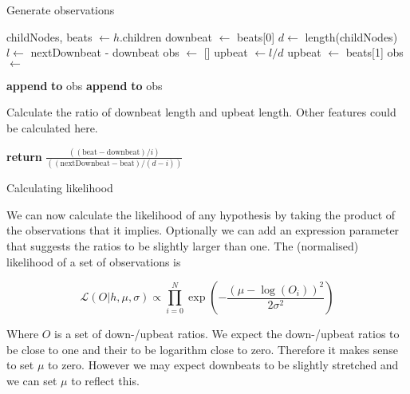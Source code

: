 \begin{algorithm}
\caption{Generate observations}
\label{alg:observations}
\begin{algorithmic}
	\State childNodes, beats $\leftarrow h$.children
		\State downbeat $\leftarrow$ beats[0]
	\EndIf
	\State $d \leftarrow$ length(childNodes)
	\State $l \leftarrow$ nextDownbeat - downbeat
	\State obs $\leftarrow$ []
		\State upbeat $\leftarrow l/d$
			\State upbeat $\leftarrow$ beats[1]
		\EndIf
		\State obs $\leftarrow$ 
	\EndIf
	
			\State \textbf{append}  \textbf{to} obs
		\EndIf	
			\State \textbf{append}  \textbf{to} obs
		\EndIf
	\EndFor
\EndFunction
\end{algorithmic}
\end{algorithm}

\begin{algorithm}
\caption{Calculate the ratio of downbeat length and upbeat length. Other features could be calculated here.}
\label{alg:features}
\begin{algorithmic}
	\State \textbf{return} $\frac{((\mathrm{beat} - \mathrm{downbeat}) / i)}{((\mathrm{nextDownbeat} - \mathrm{beat}) / (d - i))}$
\EndFunction
\end{algorithmic}
\end{algorithm}

Calculating likelihood

We can now calculate the likelihood of any hypothesis by taking the product of the observations that it implies. Optionally we can add an expression parameter that suggests the ratios to be slightly larger than one. The (normalised) likelihood of a set of observations is

\begin{equation}
\label{eq:h_likelihood}
\mathcal{L}(O|h, \mu, \sigma) \propto \prod_{i=0}^N \exp\left(-\frac{(\mu - \log(O_i))^2}{2\sigma^2}\right)
\end{equation}

Where $O$ is a set of down-/upbeat ratios. We expect the down-/upbeat ratios to be close to one and their to be logarithm close to zero. Therefore it makes sense to set $\mu$ to zero. However we may expect downbeats to be slightly stretched and we can set $\mu$ to reflect this.

